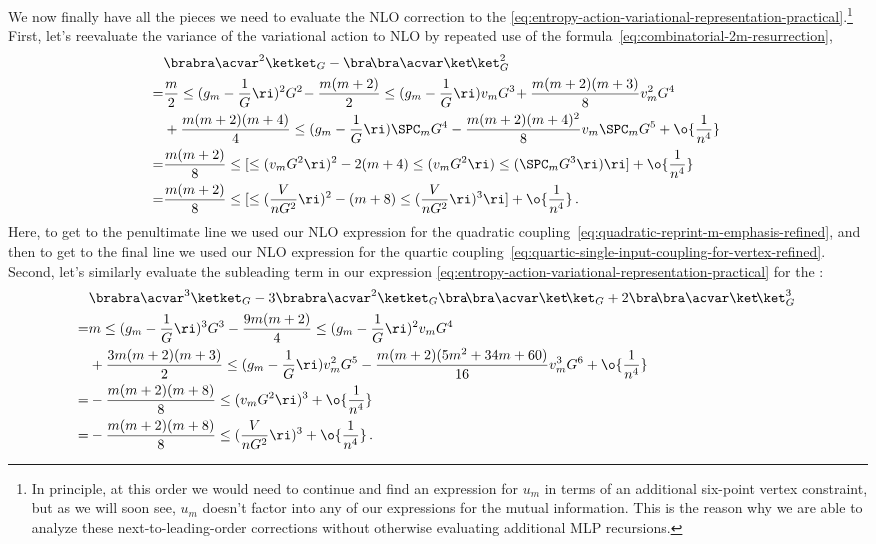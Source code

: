 We now finally have all the pieces we need to evaluate the NLO correction to the  \eqref{eq:entropy-action-variational-representation-practical}.\footnote{
    In principle,  at this order we would need to continue and find an expression for $u_m$ in terms of an additional six-point vertex constraint, but as we will soon see, $u_m$ doesn't factor into any of our expressions for the mutual information. %
    This is the reason why we are able to analyze these next-to-leading-order corrections without otherwise evaluating  additional MLP recursions.
}
First, let's  reevaluate the variance of the variational action to NLO by
repeated use of the formula~\eqref{eq:combinatorial-2m-resurrection},
\begin{align}\label{eq:not-too-bad-1}
&\brabra \acvar^2\ketket_{G}-\bra\!\bra \acvar\ket\!\ket_{G}^2\, \\
=&\frac{m}{2}\le(g_{m}-\frac{1}{G}\ri)^2G^2\!-\frac{m(m+2)}{2}\le(g_{m}-\frac{1}{G}\ri)v_mG^3\!+\frac{m(m+2)(m+3)}{8}v_m^2 G^4\, \notag\\
&+\frac{m(m+2)(m+4)}{4}\le(g_{m}-\frac{1}{G}\ri)\SPC_mG^4-\frac{m(m+2)(m+4)^2}{8}v_m \SPC_m G^5+\o{\frac{1}{n^4}}\, \notag\\
=&\frac{m(m+2)}{8}\le[\le(v_mG^2\ri)^2-2(m+4)\le(v_mG^2\ri)\le(\SPC_mG^3\ri)\ri]+\o{\frac{1}{n^4}}\, \notag\\
=&\frac{m(m+2)}{8}\le[\le(\frac{V}{nG^2}\ri)^2-(m+8)\le(\frac{V}{nG^2}\ri)^3\ri]+\o{\frac{1}{n^4}}\, .\notag
\end{align}
Here, to get to the penultimate line we used our NLO expression for the quadratic coupling~\eqref{eq:quadratic-reprint-m-emphasis-refined}, and then to get to the final line we used our NLO expression for the quartic coupling~\eqref{eq:quartic-single-input-coupling-for-vertex-refined}.
Second, let's similarly evaluate the subleading term in our expression \eqref{eq:entropy-action-variational-representation-practical} for the  :
\begin{align}\label{eq:not-too-bad-2}
&\brabra \acvar^3\ketket_{G}-3\brabra \acvar^2\ketket_{G}\bra\!\bra \acvar\ket\!\ket_{G}+2\bra\!\bra \acvar\ket\!\ket_{G}^3\, \\
=&m\le(g_{m}-\frac{1}{G}\ri)^3G^3-\frac{9m(m+2)}{4}\le(g_{m}-\frac{1}{G}\ri)^2v_mG^4\, \notag\\
&+\frac{3m(m+2)(m+3)}{2}\le(g_{m}-\frac{1}{G}\ri)v_m^2G^5-\frac{m(m+2)(5m^2+34m+60)}{16}v_m^3 G^6+\o{\frac{1}{n^4}}\, \notag\\
=&-\frac{m(m+2)(m+8)}{8}\le(v_mG^2\ri)^3+\o{\frac{1}{n^4}}\, \notag\\
=&-\frac{m(m+2)(m+8)}{8}\le(\frac{V}{nG^2}\ri)^3+\o{\frac{1}{n^4}}\, .\notag
\end{align}
